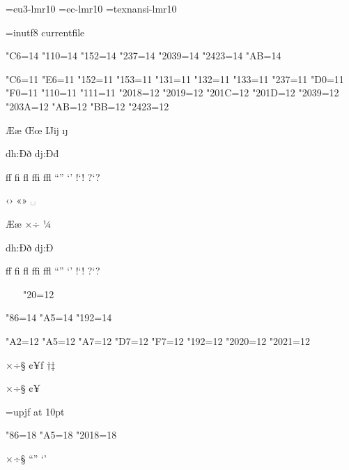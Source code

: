 %
\parindent=0pt

\font\eulmr=eu3-lmr10
\font\eclmr=ec-lmr10
\font\lylmr=texnansi-lmr10

\ifx\ocp\undefined\else
 \ocp\ORGin=inutf8
 \InputTranslation currentfile \ORGin
\fi

\ifx\kcatcode\undefined\else
 \kcatcode"C6=14
 \kcatcode"110=14
 \kcatcode"152=14
 \kcatcode"237=14
 \kcatcode"2039=14
 \kcatcode"2423=14
 \kcatcode"AB=14
\fi

\catcode"C6=11  %
\catcode"E6=11  %
\catcode"152=11 %
\catcode"153=11 %
\catcode"131=11 %
\catcode"132=11 %
\catcode"133=11 %
\catcode"237=11 %
\catcode"D0=11  %
\catcode"F0=11  %
\catcode"110=11 %
\catcode"111=11 %
\catcode"2018=12 %
\catcode"2019=12 %
\catcode"201C=12 %
\catcode"201D=12 %
\catcode"2039=12 %
\catcode"203A=12 %
\catcode"AB=12  %
\catcode"BB=12  %
\catcode"2423=12 %

\eulmr

Ææ Œœ Ĳĳ ıȷ

dh:Ðð   dj:Đđ

ff fi fl ffi ffl ``'' `' !`!  ?`?

‹› «» ␣

{
\eclmr

^^c6^^e6 ^^d7^^f7 ^^9c^^bc ^^19^^1a

dh:^^d0^^f0   dj:^^d0^^9e

ff fi fl ffi ffl ``'' `' !`!  ?`?

^^0e^^0f ^^13^^14 %
\catcode"20=12 ^^20
}

\ifx\kcatcode\undefined\else
 \kcatcode"86=14
 \kcatcode"A5=14
 \kcatcode"192=14
\fi

\catcode"A2=12  %
\catcode"A5=12  %
\catcode"A7=12  %
\catcode"D7=12  %
\catcode"F7=12  %
\catcode"192=12 %
\catcode"2020=12 %
\catcode"2021=12 %

×÷§ ¢¥ƒ †‡

{
\lylmr

^^d7^^f7^^a7 ^^a2^^a5^^83 ^^86^^87
}

\ifx\kcatcode\undefined\else
 \font\upjf=upjf at 10pt
 \upjf

 \kcatcode"86=18
 \kcatcode"A5=18
 \kcatcode"2018=18

 ×÷§ “” ‘’
\fi

\bye
